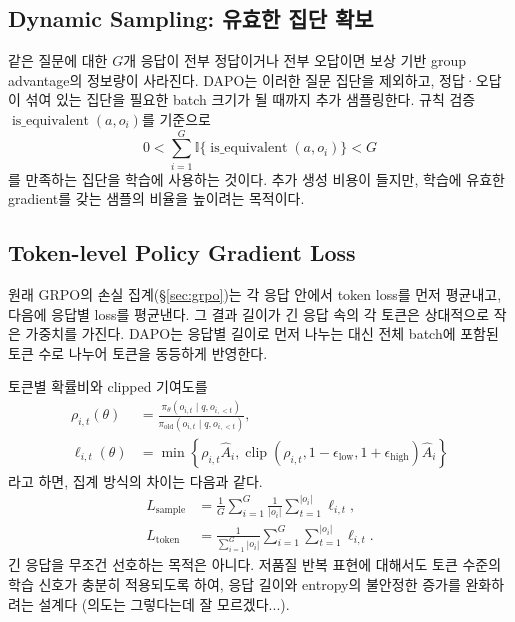 \documentclass[11pt,a4paper]{article}
\newcommand{\clip}{\operatorname{clip}}
\newcommand{\ind}{\mathbb{I}}
\begin{document}
\subsection{Dynamic Sampling: 유효한 집단 확보}
같은 질문에 대한 \(G\)개 응답이 전부 정답이거나 전부 오답이면 보상 기반 group advantage의 정보량이 사라진다. DAPO는 이러한 질문 집단을 제외하고, 정답·오답이 섞여 있는 집단을 필요한 batch 크기가 될 때까지 추가 샘플링한다. 규칙 검증 \(\operatorname{is\_equivalent}(a,o_i)\)를 기준으로
\begin{equation}
 0<\sum_{i=1}^G \ind\{\operatorname{is\_equivalent}(a,o_i)\}<G
\end{equation}
를 만족하는 집단을 학습에 사용하는 것이다. 추가 생성 비용이 들지만, 학습에 유효한 gradient를 갖는 샘플의 비율을 높이려는 목적이다.

\subsection{Token-level Policy Gradient Loss}
원래 GRPO의 손실 집계(\S\ref{sec:grpo})는 각 응답 안에서 token loss를 먼저 평균내고, 다음에 응답별 loss를 평균낸다. 그 결과 길이가 긴 응답 속의 각 토큰은 상대적으로 작은 가중치를 가진다. DAPO는 응답별 길이로 먼저 나누는 대신 전체 batch에 포함된 토큰 수로 나누어 토큰을 동등하게 반영한다.

토큰별 확률비와 clipped 기여도를
\begin{align}
 \rho_{i,t}(\theta)&=\frac{\pi_\theta(o_{i,t}\mid q,o_{i,<t})}{\pi_{\mathrm{old}}(o_{i,t}\mid q,o_{i,<t})},\\
 \ell_{i,t}(\theta)&=\min\left\{\rho_{i,t}\widehat A_i,
 \clip(\rho_{i,t},1-\epsilon_{\mathrm{low}},1+\epsilon_{\mathrm{high}})\widehat A_i\right\}
\end{align}
라고 하면, 집계 방식의 차이는 다음과 같다.
\begin{align}
 L_{\mathrm{sample}}&=\frac1G\sum_{i=1}^G\frac1{|o_i|}\sum_{t=1}^{|o_i|}\ell_{i,t},\\
 L_{\mathrm{token}}&=\frac{1}{\sum_{i=1}^G|o_i|}\sum_{i=1}^G\sum_{t=1}^{|o_i|}\ell_{i,t}.
\end{align}
긴 응답을 무조건 선호하는 목적은 아니다. 저품질 반복 표현에 대해서도 토큰 수준의 학습 신호가 충분히 적용되도록 하여, 응답 길이와 entropy의 불안정한 증가를 완화하려는 설계다 (의도는 그렇다는데 잘 모르겠다...).
\end{document}
